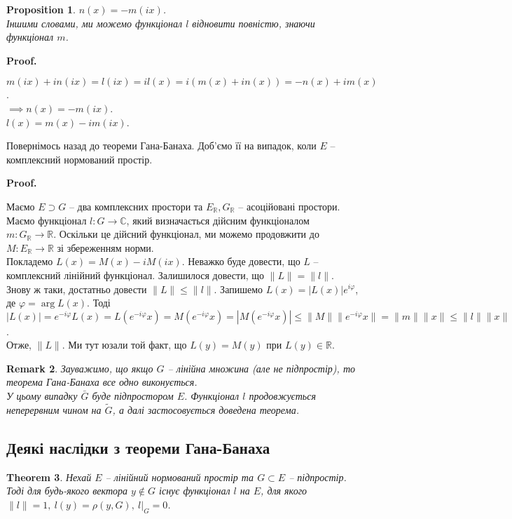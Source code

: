 \documentclass[a4paper, 10pt]{article}
\makeatletter
\theoremstyle{theoremdd}
\newtheorem{theorem}{Theorem}[subsection]
\theoremstyle{theoremdd}
\theoremstyle{theoremdd}
\theoremstyle{theoremdd}
\theoremstyle{theoremdd}
\newtheorem{proposition}[theorem]{Proposition}
\theoremstyle{theoremdd}
\newtheorem{remark}[theorem]{Remark}
\theoremstyle{theoremdd}
\theoremstyle{theoremdd}
\renewenvironment{proof}[1][Proof.\\]{\par
\pushQED{\hfill \qed}%
\normalfont \topsep6\p@\@plus6\p@\relax
\trivlist
\item\relax
{\bfseries
#1\@addpunct{.}}\hspace\labelsep\ignorespaces
}{%
\popQED\endtrivlist\@endpefalse
}
\makeatother
\begin{document}
\begin{proposition}
$n(x) = -m(ix)$.\\
Іншими словами, ми можемо функціонал $l$ відновити повністю, знаючи функціонал $m$.
\end{proposition}

\begin{proof}
$m(ix) + in(ix) = l(ix) = i l(x) = i(m(x) + in(x)) = -n(x) + im(x)$.\\
$\implies n(x) = -m(ix)$.\\
$l(x) = m(x) -im(ix)$.
\end{proof}

Повернімось назад до теореми Гана-Банаха. Доб'ємо її на випадок, коли $E$ -- комплексний нормований простір.
\begin{proof}
Маємо $E \supset G$ -- два комплексних простори та $E_{\mathbb{R}}, G_{\mathbb{R}}$ -- асоційовані простори. Маємо функціонал $l \colon G \to \mathbb{C}$, який визначається дійсним функціоналом $m \colon G_{\mathbb{R}} \to \mathbb{R}$. Оскільки це дійсний функціонал, ми можемо продовжити до $M \colon E_{\mathbb{R}} \to \mathbb{R}$ зі збереженням норми.\\
Покладемо $L(x) = M(x) - i M(ix)$. Неважко буде довести, що $L$ -- комплексний лінійний функціонал. Залишилося довести, що $\|L\| = \|l\|$. Знову ж таки, достатньо довести $\|L\| \leq \|l\|$. Запишемо $L(x) = |L(x)|e^{i \varphi}$, де $\varphi = \arg L(x)$. Тоді\\
$|L(x)| = e^{-i \varphi} L(x) = L(e^{-i \varphi} x) = M(e^{-i \varphi} x) = |M(e^{-i \varphi}x)| \leq \|M\| \|e^{-i \varphi} x\| = \|m\| \|x\| \leq \|l\| \|x\|$.\\
Отже, $\|L\|$. Ми тут юзали той факт, що $L(y) = M(y)$ при $L(y) \in \mathbb{R}$.
\end{proof}

\begin{remark}
Зауважимо, що якщо $G$ -- лінійна множина (але не підпростір), то теорема Гана-Банаха все одно виконується.\\
У цьому випадку $\bar{G}$ буде підпростором $E$. Функціонал $l$ продовжується неперервним чином на $\tilde{G}$, а далі застосовується доведена теорема.
\end{remark}


\subsection{Деякі наслідки з теореми Гана-Банаха}
\begin{theorem}
Нехай $E$ -- лінійний нормований простір та $G \subset E$ -- підпростір. Тоді для будь-якого вектора $y \notin G$ існує функціонал $l$ на $E$, для якого $\|l\| = 1,\ l(y) = \rho(y,G),\ l|_G = 0$.
\end{theorem}
\end{document}
